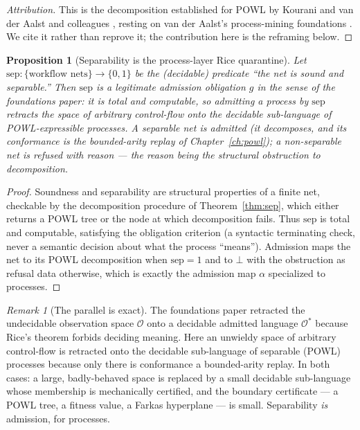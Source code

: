 \documentclass[11pt,oneside]{book}
\theoremstyle{definition}
\theoremstyle{plain}
\newtheorem{proposition}[theorem]{Proposition}
\theoremstyle{remark}
\newtheorem*{remark}{Remark}
\newcommand{\Obs}{\mathcal{O}}                 %
\newcommand{\Adm}{\mathcal{O}^{*}}             %
\newcommand{\adm}{\alpha}                      %
\newcommand{\Rfsl}{\bot}                        %
\begin{document}
\begin{proof}[Attribution]
This is the decomposition established for POWL by Kourani and van der Aalst and colleagues
\cite{powl2023}, resting on van der Aalst's process-mining foundations \cite{vdaalst2016}. We
cite it rather than reprove it; the contribution here is the reframing below. \end{proof}

\begin{proposition}[Separability is the process-layer Rice quarantine]\label{prop:quarantine}
Let $\text{sep}:\{\text{workflow nets}\}\to\{0,1\}$ be the (decidable) predicate ``the net is
sound and separable.'' Then $\text{sep}$ is a legitimate admission obligation $g$ in the sense
of the foundations paper: it is total and computable, so admitting a process by $\text{sep}$
retracts the space of arbitrary control-flow onto the decidable sub-language of POWL-expressible
processes. A separable net is \emph{admitted} (it decomposes, and its conformance is the
bounded-arity replay of Chapter~\ref{ch:powl}); a non-separable net is \emph{refused with
reason} --- the reason being the structural obstruction to decomposition.
\end{proposition}

\begin{proof}
Soundness and separability are structural properties of a finite net, checkable by the
decomposition procedure of Theorem~\ref{thm:sep}, which either returns a POWL tree or the node
at which decomposition fails. Thus $\text{sep}$ is total and computable, satisfying the
obligation criterion (a syntactic terminating check, never a semantic decision about what the
process ``means''). Admission maps the net to its POWL decomposition when $\text{sep}=1$ and to
$\Rfsl$ with the obstruction as refusal data otherwise, which is exactly the admission map
$\adm$ specialized to processes. \end{proof}

\begin{remark}[The parallel is exact]
The foundations paper retracted the undecidable observation space $\Obs$ onto a decidable
admitted language $\Adm$ because Rice's theorem forbids deciding meaning. Here an unwieldy space
of arbitrary control-flow is retracted onto the decidable sub-language of separable (POWL)
processes because only there is conformance a bounded-arity replay. In both cases: a large,
badly-behaved space is replaced by a small decidable sub-language whose membership is
mechanically certified, and the boundary certificate --- a POWL tree, a fitness value, a Farkas
hyperplane --- is small. Separability \emph{is} admission, for processes.
\end{remark}
\end{document}

